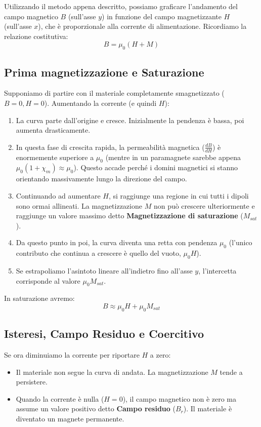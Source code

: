 \documentclass{book}
\begin{document}
Utilizzando il metodo appena descritto, possiamo graficare l'andamento del campo magnetico $B$ (sull'asse $y$) in funzione del campo magnetizzante $H$ (sull'asse $x$), che è proporzionale alla corrente di alimentazione.
Ricordiamo la relazione costitutiva:
$$
B = \mu_0 (H + M)
$$

\subsection{Prima magnetizzazione e Saturazione}
Supponiamo di partire con il materiale completamente smagnetizzato ($B=0, H=0$).
Aumentando la corrente (e quindi $H$):
\begin{enumerate}
    \item La curva parte dall'origine e cresce. Inizialmente la pendenza è bassa, poi aumenta drasticamente.
    \item In questa fase di crescita rapida, la permeabilità magnetica ($\frac{dB}{dH}$) è enormemente superiore a $\mu_0$ (mentre in un paramagnete sarebbe appena $\mu_0(1+\chi_m) \approx \mu_0$). Questo accade perché i domini magnetici si stanno orientando massivamente lungo la direzione del campo.
    \item Continuando ad aumentare $H$, si raggiunge una regione in cui tutti i dipoli sono ormai allineati. La magnetizzazione $M$ non può crescere ulteriormente e raggiunge un valore massimo detto \textbf{Magnetizzazione di saturazione} ($M_{sat}$).
    \item Da questo punto in poi, la curva diventa una retta con pendenza $\mu_0$ (l'unico contributo che continua a crescere è quello del vuoto, $\mu_0 H$).
    \item Se estrapoliamo l'asintoto lineare all'indietro fino all'asse $y$, l'intercetta corrisponde al valore $\mu_0 M_{sat}$.
\end{enumerate}
In saturazione avremo:
$$ B \approx \mu_0 H + \mu_0 M_{sat} $$

\subsection{Isteresi, Campo Residuo e Coercitivo}
Se ora diminuiamo la corrente per riportare $H$ a zero:
\begin{itemize}
    \item Il materiale non segue la curva di andata. La magnetizzazione $M$ tende a persistere.
    \item Quando la corrente è nulla ($H=0$), il campo magnetico non è zero ma assume un valore positivo detto \textbf{Campo residuo} ($B_r$). Il materiale è diventato un magnete permanente.
\end{itemize}
\end{document}
